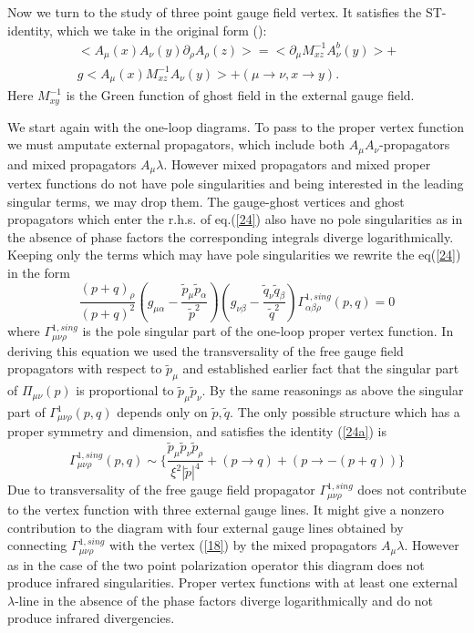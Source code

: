 \documentclass[a4paper,12pt]{article}
\begin{document}
Now we turn to the study of three point gauge field vertex. It satisfies 
the ST-identity, which we take in the original form (\cite{Sl}):
\begin{eqnarray} 
<A_{\mu}(x)A_{\nu}(y) \partial_{\rho}A_{\rho}(z)>=
<\partial_{\mu}M^{-1}_{xz}A_{\nu}^b(y)>+\nonumber\\
g<A_{\mu}(x)M^{-1}_{xz}A_{\nu}(y)>+( \mu \rightarrow \nu, x \rightarrow 
 y).
\label{24} 
\end{eqnarray} 
Here $M^{-1}_{xy}$ is the Green function of ghost field in the external 
gauge field.
 
 We start again with the one-loop diagrams. To pass to the proper vertex 
  function we must amputate external propagators, which include both 
  $A_{\mu} A_{\nu}$-propagators and mixed propagators $A_{\mu} \lambda$. 
  However mixed propagators and mixed proper vertex functions do not have 
  pole singularities and being interested in the leading singular terms, 
 we may drop them. The gauge-ghost vertices and ghost propagators which 
 enter the r.h.s. of eq.(\ref{24}) also have no pole singularities as in 
 the absence of phase factors the corresponding integrals diverge 
 logarithmically.  Keeping only the terms which may have pole 
 singularities we rewrite the eq(\ref{24}) in the form \begin{equation} 
\frac{(p+q)_{\rho}}{(p+q)^2}(g_{\mu \alpha}- \frac{\tilde{p}_{\mu} 
 \tilde{p}_{\alpha}}{\tilde{p}^2})(g_{\nu \beta}- \frac{\tilde{q}_{\nu} 
 \tilde{q}_{\beta}}{\tilde{q}^2}) \Gamma^{1, 
 sing}_{\alpha \beta \rho}(p,q)=0
\label{24a} 
 \end{equation} 
where $\Gamma^{1, sing}_{\mu \nu \rho}$ is the pole singular part of the 
one-loop proper vertex function. In deriving this equation we used the 
transversality of the free gauge field propagators with respect to 
$\tilde{p}_{\mu}$ and established earlier fact that the singular part of 
$ \Pi_{\mu \nu}(p)$ is proportional to 
$\tilde{p}_{\mu} \tilde{p}_{\nu}$. By the same reasonings as above the 
singular part of $\Gamma^1_{\mu \nu \rho}(p,q)$ depends only on $ 
\tilde{p}, \tilde{q}$.  The only possible structure which has a proper 
symmetry and dimension, and satisfies the identity (\ref{24a}) is 
\begin{equation} \Gamma^{1, sing}_{\mu \nu \rho}(p,q) \sim \{ 
\frac{\tilde{p}_{\mu} \tilde{p}_{\nu} 
 \tilde{p}_{\rho}}{\xi^2|\tilde{p}|^4}+ (p \rightarrow q)+(p \rightarrow 
 -(p+q)) \} \label{25} 
 \end{equation}
 Due to transversality of the free gauge field propagator $\Gamma^{1, 
sing}_{\mu \nu \rho}$ does not contribute to the vertex function with 
  three external gauge lines. It might give a nonzero contribution to the 
  diagram with four external gauge lines obtained by connecting 
  $\Gamma^{1, sing}_{\mu \nu \rho}$ with the vertex (\ref{18}) by the 
  mixed propagators $A_{\mu} \lambda$. However as in the case of the 
  two point polarization operator this diagram does not produce 
  infrared singularities. 
  Proper vertex functions with at least one external $\lambda$-line in 
  the absence of the phase factors diverge logarithmically and do 
  not produce infrared divergencies.
  
\end{document}
